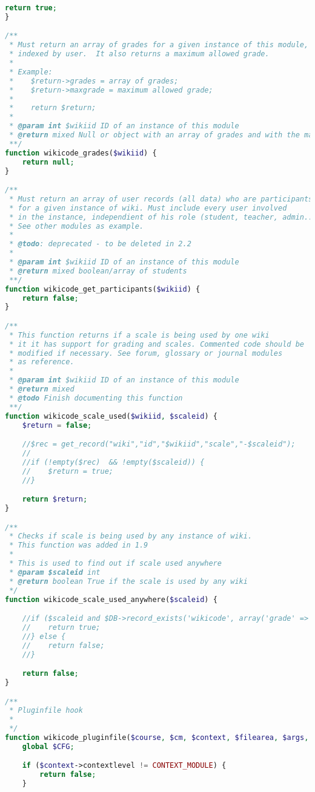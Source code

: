 \begin{lstlisting}[language=PHP]
    return true;
}

/**
 * Must return an array of grades for a given instance of this module,
 * indexed by user.  It also returns a maximum allowed grade.
 *
 * Example:
 *    $return->grades = array of grades;
 *    $return->maxgrade = maximum allowed grade;
 *
 *    return $return;
 *
 * @param int $wikiid ID of an instance of this module
 * @return mixed Null or object with an array of grades and with the maximum grade
 **/
function wikicode_grades($wikiid) {
    return null;
}

/**
 * Must return an array of user records (all data) who are participants
 * for a given instance of wiki. Must include every user involved
 * in the instance, independient of his role (student, teacher, admin...)
 * See other modules as example.
 *
 * @todo: deprecated - to be deleted in 2.2
 *
 * @param int $wikiid ID of an instance of this module
 * @return mixed boolean/array of students
 **/
function wikicode_get_participants($wikiid) {
    return false;
}

/**
 * This function returns if a scale is being used by one wiki
 * it it has support for grading and scales. Commented code should be
 * modified if necessary. See forum, glossary or journal modules
 * as reference.
 *
 * @param int $wikiid ID of an instance of this module
 * @return mixed
 * @todo Finish documenting this function
 **/
function wikicode_scale_used($wikiid, $scaleid) {
    $return = false;

    //$rec = get_record("wiki","id","$wikiid","scale","-$scaleid");
    //
    //if (!empty($rec)  && !empty($scaleid)) {
    //    $return = true;
    //}

    return $return;
}

/**
 * Checks if scale is being used by any instance of wiki.
 * This function was added in 1.9
 *
 * This is used to find out if scale used anywhere
 * @param $scaleid int
 * @return boolean True if the scale is used by any wiki
 */
function wikicode_scale_used_anywhere($scaleid) {

    //if ($scaleid and $DB->record_exists('wikicode', array('grade' => -$scaleid))) {
    //    return true;
    //} else {
    //    return false;
    //}

    return false;
}

/**
 * Pluginfile hook
 *
 */
function wikicode_pluginfile($course, $cm, $context, $filearea, $args, $forcedownload) {
    global $CFG;

    if ($context->contextlevel != CONTEXT_MODULE) {
        return false;
    }


\end{lstlisting}
